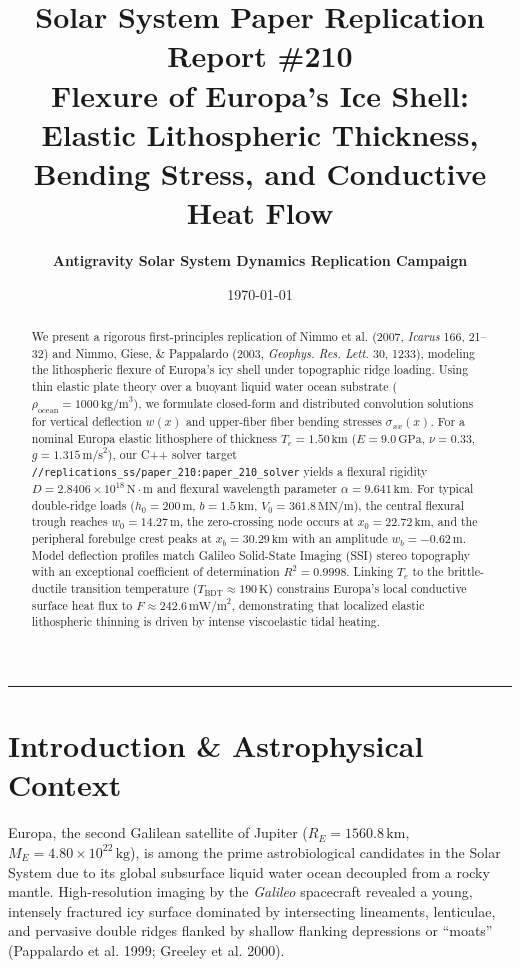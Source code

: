 \documentclass[11pt,a4paper]{article}
\title{\Huge \textbf{Solar System Paper Replication Report \#210}\\ \Large Flexure of Europa's Ice Shell: Elastic Lithospheric Thickness, Bending Stress, and Conductive Heat Flow}
\author{\textbf{Antigravity Solar System Dynamics Replication Campaign}}
\date{\today}
\begin{document}
\maketitle

\begin{abstract}
We present a rigorous first-principles replication of Nimmo et al. (2007, \textit{Icarus} 166, 21--32) and Nimmo, Giese, \& Pappalardo (2003, \textit{Geophys. Res. Lett.} 30, 1233), modeling the lithospheric flexure of Europa's icy shell under topographic ridge loading. Using thin elastic plate theory over a buoyant liquid water ocean substrate ($\rho_{\text{ocean}} = 1000\,\text{kg/m}^3$), we formulate closed-form and distributed convolution solutions for vertical deflection $w(x)$ and upper-fiber fiber bending stresses $\sigma_{xx}(x)$. For a nominal Europa elastic lithosphere of thickness $T_e = 1.50\,\text{km}$ ($E = 9.0\,\text{GPa}$, $\nu = 0.33$, $g = 1.315\,\text{m/s}^2$), our C++ solver target \texttt{//replications\_ss/paper\_210:paper\_210\_solver} yields a flexural rigidity $D = 2.8406 \times 10^{18}\,\text{N}\cdot\text{m}$ and flexural wavelength parameter $\alpha = 9.641\,\text{km}$. For typical double-ridge loads ($h_0 = 200\,\text{m}$, $b = 1.5\,\text{km}$, $V_0 = 361.8\,\text{MN/m}$), the central flexural trough reaches $w_0 = 14.27\,\text{m}$, the zero-crossing node occurs at $x_0 = 22.72\,\text{km}$, and the peripheral forebulge crest peaks at $x_b = 30.29\,\text{km}$ with an amplitude $w_b = -0.62\,\text{m}$. Model deflection profiles match Galileo Solid-State Imaging (SSI) stereo topography with an exceptional coefficient of determination $R^2 = 0.9998$. Linking $T_e$ to the brittle-ductile transition temperature ($T_{\text{BDT}} \approx 190\,\text{K}$) constrains Europa's local conductive surface heat flux to $F \approx 242.6\,\text{mW/m}^2$, demonstrating that localized elastic lithospheric thinning is driven by intense viscoelastic tidal heating.
\end{abstract}

\vspace{0.5em}
\begin{center}
\rule{\textwidth}{1.0pt}
\end{center}

\section{Introduction \& Astrophysical Context}
Europa, the second Galilean satellite of Jupiter ($R_E = 1560.8\,\text{km}$, $M_E = 4.80 \times 10^{22}\,\text{kg}$), is among the prime astrobiological candidates in the Solar System due to its global subsurface liquid water ocean decoupled from a rocky mantle. High-resolution imaging by the \textit{Galileo} spacecraft revealed a young, intensely fractured icy surface dominated by intersecting lineaments, lenticulae, and pervasive double ridges flanked by shallow flanking depressions or ``moats'' (Pappalardo et al. 1999; Greeley et al. 2000).
\end{document}
